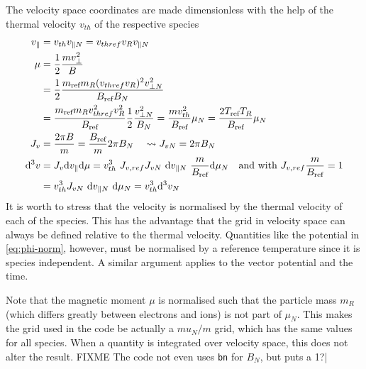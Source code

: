 The velocity space coordinates are made dimensionless with the help of 
the thermal velocity $v_{th}$ of the respective species 
\begin{align}
  \label{eq:normalisation-velocityspace}
  v_\parallel &= v_{th}v_{\parallel N} = v_{thref} v_R v_{\parallel N} \\
\mu &= \frac{1}{2}\frac{mv_\perp^2}{B}  \nonumber\\
&= \frac{1}{2}\frac{m_\tref m_R(v_{thref}v_R)^2v_{\perp N}^2}{B_\tref B_N} \nonumber\\
&= \frac{m_\tref m_Rv_{thref}^2v_R^2}{B_\tref } \frac{1}{2}\frac{v_{\perp N}^2}{B_N}
= \frac{mv_{th}^2}{B_\tref } \mu_N 
= \frac{2T_\tref T_R}{B_\tref } \mu_N 
\label{eq:normalisation-velocityspace-mu}
\\
J_v &= \frac{2\pi B}{m} = \frac{B_\tref}{m} 2\pi B_N \quad\leadsto  J_{vN} = 2\pi B_N\\
\ud^3 v &= J_v \ud v_{\parallel} \ud\mu = v_{th}^3 \ J_{v,ref}J_{vN}\ \ud v_{\parallel N}\ \frac{m}{B_\tref }\ud\mu_N \quad\text{and with } J_{v,ref}\frac{m}{B_\tref } = 1 \nonumber\\
&= v_{th}^3 J_{vN}\ \ud v_{\parallel N}\ \ud\mu_N = v_{th}^3\ud^3v_N
\end{align}
It is worth to stress that the velocity is normalised by the thermal velocity of each of the species. 
This has the advantage that the grid in velocity space can always be defined relative to the thermal 
velocity. 
Quantities like the potential in \eqref{eq:phi-norm}, however, must be normalised by a reference temperature since it is 
species independent. 
A similar argument applies to the vector potential and the time. 

Note that the magnetic moment $\mu$ is normalised such that the
particle mass $m_R$ (which differs greatly between electrons and ions)
is not part of $\mu_N$. This makes the grid used in the code be
actually a $mu_N/m$ grid, which has the same values for all
species. When a quantity is integrated over velocity space, this does
not alter the result.
FIXME The code not even uses \texttt{bn} for $B_N$, but puts a 1?|

